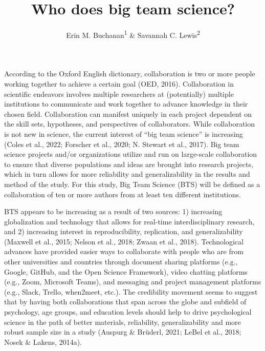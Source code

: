 \documentclass[
  man]{apa7}
\title{Who does big team science?}
\author{Erin M. Buchanan\textsuperscript{1} \& Savannah C. Lewis\textsuperscript{2}}
\date{}
\affiliation{\vspace{0.5cm}\textsuperscript{1} Harrisburg University of Science and Technology\\\textsuperscript{2} University of Alabama}
\begin{document}
\maketitle

According to the Oxford English dictionary, collaboration is two or more
people working together to achieve a certain goal (OED, 2016).
Collaboration in scientific endeavors involves multiple researchers at
(potentially) multiple institutions to communicate and work together to
advance knowledge in their chosen field. Collaboration can manifest
uniquely in each project dependent on the skill sets, hypotheses, and
perspectives of collaborators. While collaboration is not new in
science, the current interest of ``big team science'' is increasing
(Coles et al., 2022; Forscher et al., 2020; N. Stewart et al., 2017). Big team science projects
and/or organizations utilize and run on large-scale collaboration to
ensure that diverse populations and ideas are brought into research
projects, which in turn allows for more reliability and generalizability
in the results and method of the study. For this study, Big Team Science
(BTS) will be defined as a collaboration of ten or more authors from at
least ten different institutions.

BTS appears to be increasing as a result of two sources: 1) increasing
globalization and technology that allows for real-time interdisciplinary
research, and 2) increasing interest in reproducibility, replication,
and generalizability (Maxwell et al., 2015; Nelson et al., 2018; Zwaan et al., 2018).
Technological advances have provided easier ways to collaborate with
people who are from other universities and countries through document
sharing platforms (e.g., Google, GitHub, and the Open Science
Framework), video chatting platforms (e.g., Zoom, Microsoft Teams), and
messaging and project management platforms (e.g., Slack, Trello,
when2meet, etc.). The credibility movement seems to suggest that by
having both collaborations that span across the globe and subfield of
psychology, age groups, and education levels should help to drive
psychological science in the path of better materials, reliability,
generalizability and more robust sample size in a study
(Auspurg \& Brüderl, 2021; LeBel et al., 2018; Nosek \& Lakens, 2014a).
\end{document}
